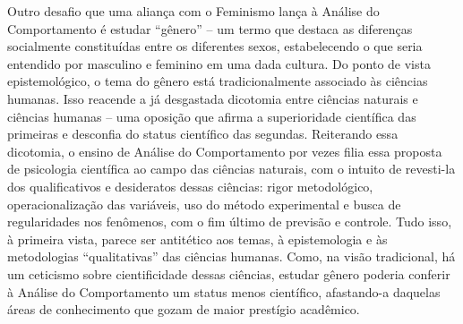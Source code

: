Outro desafio que uma aliança com o Feminismo lança à Análise do Comportamento é estudar “gênero” – um termo que destaca as diferenças socialmente constituídas entre os diferentes sexos, estabelecendo o que seria entendido por masculino e feminino em uma dada cultura. Do ponto de vista epistemológico, o tema do gênero está tradicionalmente associado às ciências humanas. Isso reacende a já desgastada dicotomia entre ciências naturais e ciências humanas – uma oposição que afirma a superioridade científica das primeiras e desconfia do status científico das segundas. Reiterando essa dicotomia, o ensino de Análise do Comportamento por vezes filia essa proposta de psicologia científica ao campo das ciências naturais, com o intuito de revesti-la dos qualificativos e desideratos dessas ciências: rigor metodológico, operacionalização das variáveis, uso do método experimental e busca de regularidades nos fenômenos, com o fim último de previsão e controle. Tudo isso, à primeira vista, parece ser antitético aos temas, à epistemologia e às metodologias “qualitativas” das ciências humanas. Como, na visão tradicional, há um ceticismo sobre cientificidade dessas ciências, estudar gênero poderia conferir à Análise do Comportamento um status menos científico, afastando-a daquelas áreas de conhecimento que gozam de maior prestígio acadêmico. 

